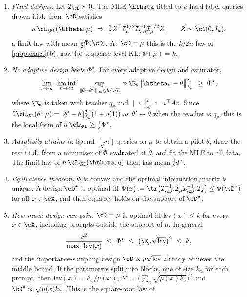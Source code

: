 \begin{theorem}\label{thm:local-design}
\begin{enumerate}[label=(\alph*),leftmargin=*]
\item \Kn\Ck \emph{Fixed designs.} Let $\mathcal I_\cD\succ0$. The MLE $\htheta$ fitted to $n$ hard-label queries drawn
i.i.d.\ from $\cD$ satisfies
\[
n\,\cL_\KL(\htheta;\mu)\ \Rightarrow\ \tfrac12Z^\top\mathcal I_\mu^{1/2}\mathcal I_\cD^{-1}\mathcal I_\mu^{1/2}Z,\qquad Z\sim\cN(0,I_k),
\]
a limit law with mean $\frac12\Phi(\cD)$. At $\cD=\mu$ this is the $k/2n$ law of \cref{prop:exact}(b), now for
sequence-level KL: $\Phi(\mu)=k$.
\item {} \emph{No adaptive design beats $\Phi^\star$.} For every adaptive design and
estimator,
\[
\lim_{b\to\infty}\ \liminf_{n\to\infty}\ \sup_{\|\theta-\theta^\circ\|_\infty\le b/\sqrt n}\ n\,\E_\theta\big\|\htheta_n-\theta\big\|^2_{\mathcal I_\mu}\ \ge\ \Phi^\star ,
\]
where $\E_\theta$ is taken with teacher $q_\theta$ and $\|v\|_A^2:=v^\top Av$. Since
$2\cL_\KL(\theta';\mu)=\|\theta'-\theta\|^2_{\mathcal I_\mu}(1+o(1))$ as $\theta'\to\theta$ when the teacher is $q_\theta$, this is the local
form of $n\,\cL_\KL\ge\frac12\Phi^\star$.
\item \Kn \emph{Adaptivity attains it.} Spend $\lceil\sqrt n\rceil$ queries on $\mu$ to obtain a pilot $\tilde\theta$, draw
the rest i.i.d.\ from a minimiser of $\Phi$ evaluated at $\tilde\theta$, and fit the MLE to all data. The limit
law of $n\,\cL_\KL(\htheta;\mu)$ then has mean $\frac12\Phi^\star$.
\item \Pv\Ck \emph{Equivalence theorem.} $\Phi$ is convex and the optimal information matrix is unique. A
design $\cD^\star$ is optimal iff
$\Psi(x):=\tr\big(\mathcal I_{\cD^\star}^{-1}\mathcal I_\mu\mathcal I_{\cD^\star}^{-1}\mathcal I_x\big)\le\Phi(\cD^\star)$ for all $x\in\cX$, and
then equality holds on the support of $\cD^\star$.
\item \Pv\Ck \emph{How much design can gain.} $\cD=\mu$ is optimal iff $\mathrm{lev}(x)\le k$ for every $x\in\cX$,
including prompts outside the support of $\mu$. In general
\[
\frac{k^2}{\max_x\mathrm{lev}(x)}\ \le\ \Phi^\star\ \le\ \big(\E_\mu\sqrt{\mathrm{lev}}\big)^2\ \le\ k ,
\]
and the importance-sampling design $\cD\propto\mu\sqrt{\mathrm{lev}}$ already achieves the middle bound. If the
parameters split into blocks, one of size $k_x$ for each prompt, then $\mathrm{lev}(x)=k_x/\mu(x)$,
$\Phi^\star=\big(\sum_x\sqrt{\mu(x)k_x}\big)^2$ and $\cD^\star\propto\sqrt{\mu(x)k_x}$. This is the square-root law of

\end{enumerate}
\end{theorem}
